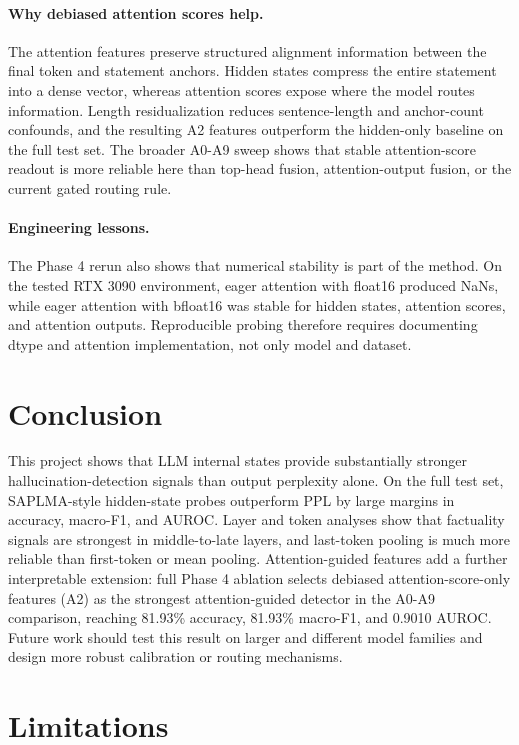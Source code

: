\documentclass[11pt]{article}
\begin{document}
\paragraph{Why debiased attention scores help.}
The attention features preserve structured alignment information between the final token and statement anchors. Hidden states compress the entire statement into a dense vector, whereas attention scores expose where the model routes information. Length residualization reduces sentence-length and anchor-count confounds, and the resulting A2 features outperform the hidden-only baseline on the full test set. The broader A0-A9 sweep shows that stable attention-score readout is more reliable here than top-head fusion, attention-output fusion, or the current gated routing rule.

\paragraph{Engineering lessons.}
The Phase 4 rerun also shows that numerical stability is part of the method. On the tested RTX 3090 environment, eager attention with float16 produced NaNs, while eager attention with bfloat16 was stable for hidden states, attention scores, and attention outputs. Reproducible probing therefore requires documenting dtype and attention implementation, not only model and dataset.

\section{Conclusion}

This project shows that LLM internal states provide substantially stronger hallucination-detection signals than output perplexity alone. On the full test set, SAPLMA-style hidden-state probes outperform PPL by large margins in accuracy, macro-F1, and AUROC. Layer and token analyses show that factuality signals are strongest in middle-to-late layers, and last-token pooling is much more reliable than first-token or mean pooling. Attention-guided features add a further interpretable extension: full Phase 4 ablation selects debiased attention-score-only features (A2) as the strongest attention-guided detector in the A0-A9 comparison, reaching 81.93\% accuracy, 81.93\% macro-F1, and 0.9010 AUROC. Future work should test this result on larger and different model families and design more robust calibration or routing mechanisms.

\section*{Limitations}
\end{document}
